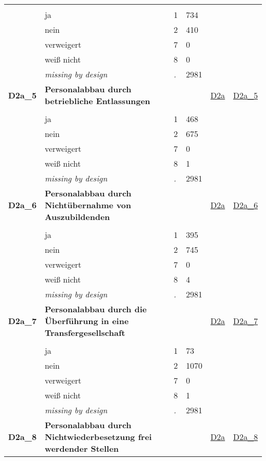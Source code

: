 \begin{longtable}{| L{2.45cm} | L{6cm} | C{1.5cm} | R{1cm} | C{2.25cm} | C{2.25cm} |}
   &  &  &  &  &  \\ 
   & ja & 1 & 734 &  &  \\ 
   & nein & 2 & 410 &  &  \\ 
   & verweigert & 7 & 0 &  &  \\ 
   & weiß nicht & 8 & 0 &  &  \\ 
   & \textit{missing by design} & \textit{.} & 2981 &  &  \\ 
   \midrule
\textbf{D2a\_5}\label{var:D2a:5} & \textbf{Personalabbau durch betriebliche Entlassungen} &  &  & \hyperref[D2a]{D2a} & \hyperref[var:suf:D2a:5]{D2a\_5} \\ 
   &  &  &  &  &  \\ 
   & ja & 1 & 468 &  &  \\ 
   & nein & 2 & 675 &  &  \\ 
   & verweigert & 7 & 0 &  &  \\ 
   & weiß nicht & 8 & 1 &  &  \\ 
   & \textit{missing by design} & \textit{.} & 2981 &  &  \\ 
   \midrule
\textbf{D2a\_6}\label{var:D2a:6} & \textbf{Personalabbau durch Nichtübernahme von Auszubildenden} &  &  & \hyperref[D2a]{D2a} & \hyperref[var:suf:D2a:6]{D2a\_6} \\ 
   &  &  &  &  &  \\ 
   & ja & 1 & 395 &  &  \\ 
   & nein & 2 & 745 &  &  \\ 
   & verweigert & 7 & 0 &  &  \\ 
   & weiß nicht & 8 & 4 &  &  \\ 
   & \textit{missing by design} & \textit{.} & 2981 &  &  \\ 
   \midrule
\textbf{D2a\_7}\label{var:D2a:7} & \textbf{Personalabbau durch die Überführung in eine Transfergesellschaft} &  &  & \hyperref[D2a]{D2a} & \hyperref[var:suf:D2a:7]{D2a\_7} \\ 
   &  &  &  &  &  \\ 
   & ja & 1 & 73 &  &  \\ 
   & nein & 2 & 1070 &  &  \\ 
   & verweigert & 7 & 0 &  &  \\ 
   & weiß nicht & 8 & 1 &  &  \\ 
   & \textit{missing by design} & \textit{.} & 2981 &  &  \\ 
   \midrule
\textbf{D2a\_8}\label{var:D2a:8} & \textbf{Personalabbau durch Nichtwiederbesetzung frei werdender Stellen} &  &  & \hyperref[D2a]{D2a} & \hyperref[var:suf:D2a:8]{D2a\_8} \\ 

\end{longtable}

